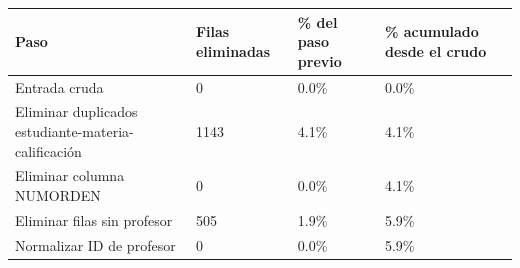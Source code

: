 \begin{tabular}{llll}
\toprule
Paso & Filas eliminadas & \% del paso previo & \% acumulado desde el crudo \\
\midrule
Entrada cruda & 0 & 0.0\% & 0.0\% \\
Eliminar duplicados estudiante-materia-calificación & 1143 & 4.1\% & 4.1\% \\
Eliminar columna NUMORDEN & 0 & 0.0\% & 4.1\% \\
Eliminar filas sin profesor & 505 & 1.9\% & 5.9\% \\
Normalizar ID de profesor & 0 & 0.0\% & 5.9\% \\
\bottomrule
\end{tabular}
